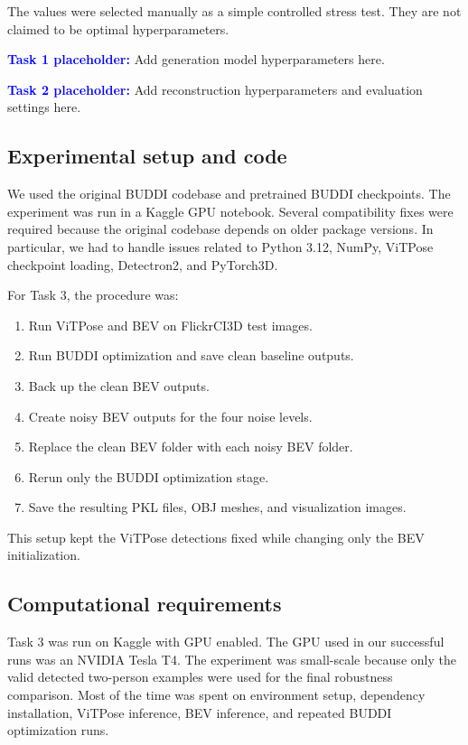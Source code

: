 \documentclass[10pt]{article}
\begin{document}
The values were selected manually as a simple controlled stress test. They are not claimed to be optimal hyperparameters.

\textcolor{blue}{\textbf{Task 1 placeholder:}} Add generation model hyperparameters here.

\textcolor{blue}{\textbf{Task 2 placeholder:}} Add reconstruction hyperparameters and evaluation settings here.

\subsection{Experimental setup and code}

We used the original BUDDI codebase and pretrained BUDDI checkpoints. The experiment was run in a Kaggle GPU notebook. Several compatibility fixes were required because the original codebase depends on older package versions. In particular, we had to handle issues related to Python 3.12, NumPy, ViTPose checkpoint loading, Detectron2, and PyTorch3D.

For Task 3, the procedure was:

\begin{enumerate}
    \item Run ViTPose and BEV on FlickrCI3D test images.
    \item Run BUDDI optimization and save clean baseline outputs.
    \item Back up the clean BEV outputs.
    \item Create noisy BEV outputs for the four noise levels.
    \item Replace the clean BEV folder with each noisy BEV folder.
    \item Rerun only the BUDDI optimization stage.
    \item Save the resulting PKL files, OBJ meshes, and visualization images.
\end{enumerate}

This setup kept the ViTPose detections fixed while changing only the BEV initialization.

\subsection{Computational requirements}

Task 3 was run on Kaggle with GPU enabled. The GPU used in our successful runs was an NVIDIA Tesla T4. The experiment was small-scale because only the valid detected two-person examples were used for the final robustness comparison. Most of the time was spent on environment setup, dependency installation, ViTPose inference, BEV inference, and repeated BUDDI optimization runs.
\end{document}
